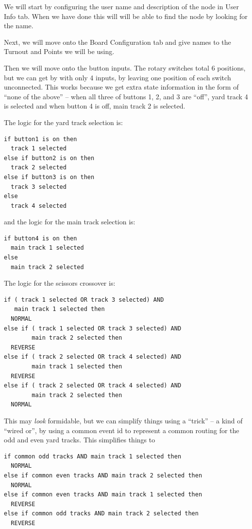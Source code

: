 We will start by configuring the user name and description of the node in User 
Info tab.  When we have done this will will be able to find the node by 
looking for the name.  

Next, we will move onto the Board Configuration tab and give names to the 
Turnout and Points we will be using.

Then we will move onto the button inputs.  The rotary switches total 6 
positions, but we can get by with only 4 inputs, by leaving one position of 
each switch unconnected.  This works because we get extra state information in 
the form of ``none of the above'' -- when all three of buttons 1, 2, and 3 are 
``off'', yard track 4 is selected and when button 4 is off, main track 2 is 
selected.

The logic for the yard track selection is:

\begin{verbatim}
if button1 is on then
  track 1 selected
else if button2 is on then
  track 2 selected
else if button3 is on then
  track 3 selected
else
  track 4 selected
\end{verbatim}

and the logic for the main track selection is:

\begin{verbatim}
if button4 is on then
  main track 1 selected
else
  main track 2 selected
\end{verbatim}

The logic for the scissors crossover is:

\begin{verbatim}
if ( track 1 selected OR track 3 selected) AND 
   main track 1 selected then
  NORMAL
else if ( track 1 selected OR track 3 selected) AND 
        main track 2 selected then
  REVERSE
else if ( track 2 selected OR track 4 selected) AND 
        main track 1 selected then
  REVERSE
else if ( track 2 selected OR track 4 selected) AND 
        main track 2 selected then
  NORMAL
\end{verbatim}

This may \textit{look} formidable, but we can simplify things using a
``trick'' -- a kind of ``wired or'', by using a common event id to represent a
common routing for the odd and even yard tracks. This simplifies things to

\begin{verbatim}
if common odd tracks AND main track 1 selected then
  NORMAL
else if common even tracks AND main track 2 selected then
  NORMAL
else if common even tracks AND main track 1 selected then
  REVERSE
else if common odd tracks AND main track 2 selected then
  REVERSE
\end{verbatim}

